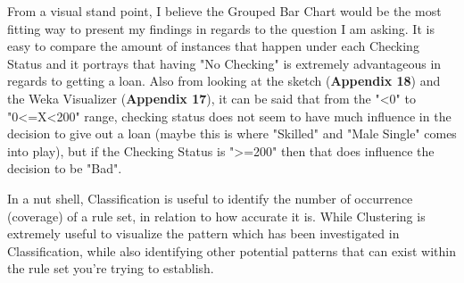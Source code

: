 \documentclass[12pt, a4paper]{article}
\begin{document}
    From a visual stand point, I believe the Grouped Bar Chart would be the most fitting way to present my findings in regards to the question I am asking. It is easy to compare the amount of instances that happen under each Checking Status and it portrays that having "No Checking" is extremely advantageous in regards to getting a loan. Also from looking at the sketch (\textbf{Appendix 18}) and the Weka Visualizer (\textbf{Appendix 17}), it can be said that from the "<0" to "0<=X<200" range, checking status does not seem to have much influence in the decision to give out a loan (maybe this is where "Skilled" and "Male Single" comes into play), but if the Checking Status is ">=200" then that does influence the decision to be "Bad".
    
    In a nut shell, Classification is useful to identify the number of occurrence (coverage) of a rule set, in relation to how accurate it is. While Clustering is extremely useful to visualize the pattern which has been investigated in Classification, while also identifying other potential patterns that can exist within the rule set you're trying to establish.
	\\
	\\
	\\
	\\
	\\
	\\
	\\
	\\
	\\
	\\
	\\
	\\
	\\
	\\
	\\
	\\
	\\
	\\
	\\
	\\
	\\
	\\
	\\
	\\
	\\
	\\
	\\
	\\
	\\
	\\
	\\
	\\
	\\
	\\
	\\
	\\
	\\
	\\
	\\
	\\
	\\
	\\
	\\
	\\
\end{document}
